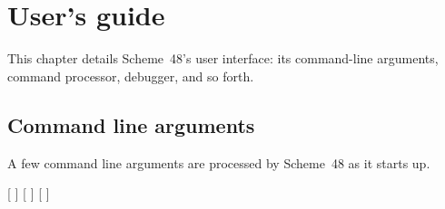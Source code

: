 
\chapter{User's guide}

This chapter details Scheme~48's user interface: its command-line arguments,
 command processor, debugger, and so forth.

\section{Command line arguments}

A few command line arguments are processed by Scheme~48 as
 it starts up.

[ ]
[ ]
[ ]

